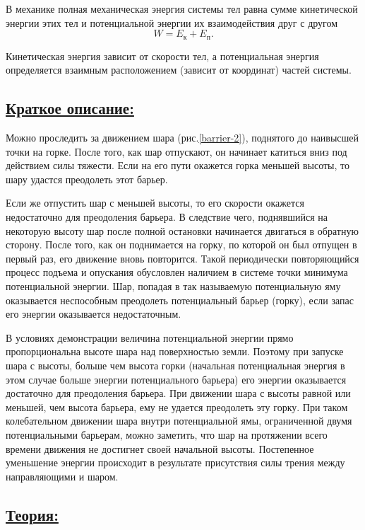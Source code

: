 \documentclass[14pt,a4paper,oneside]{extarticle}	%
\begin{document}
		В механике полная механическая энергия системы тел равна сумме кинетической энергии этих тел и потенциальной энергии их взаимодействия друг с другом
$$ W = E_{\text{к}} + E_{\text{п}}.$$

Кинетическая энергия зависит от скорости тел, а потенциальная энергия определяется взаимным расположением (зависит от координат) частей системы.

	\subsection*{\underline{Краткое описание:}}
 
Можно проследить за движением шара (рис.\ref{barrier-2}), поднятого до наивысшей точки на горке.
После того, как шар отпускают, он начинает катиться вниз под действием силы тяжести.
Если на его пути окажется горка меньшей высоты, то шару удастся преодолеть этот барьер. 

Если же отпустить шар с меньшей высоты, то его скорости окажется недостаточно для преодоления барьера. 
В следствие чего, поднявшийся на некоторую высоту шар после полной остановки начинается двигаться в обратную сторону.
После того, как он поднимается на горку, по которой он был отпущен в первый раз, его движение вновь повторится.
Такой периодически повторяющийся процесс подъема и опускания обусловлен наличием в системе точки минимума потенциальной энергии.
Шар, попадая в так называемую потенциальную яму оказывается неспособным преодолеть потенциальный барьер (горку), если запас его энергии оказывается недостаточным.

В условиях демонстрации величина потенциальной энергии прямо пропорциональна высоте шара над поверхностью земли.
Поэтому при запуске шара с высоты, больше чем высота горки (начальная потенциальная энергия в этом случае больше энергии потенциального барьера) его энергии оказывается достаточно для преодоления барьера.
При движении шара с высоты равной или меньшей, чем высота барьера, ему не удается преодолеть эту горку.
При таком колебательном движении шара внутри потенциальной ямы, ограниченной двумя потенциальными барьерам, можно заметить, что шар на протяжении всего времени движения не достигнет своей начальной высоты.
Постепенное уменьшение энергии происходит в результате присутствия силы трения между направляющими и шаром.

\newpage
\subsection*{\underline{Теория:}}
	
\end{document}
